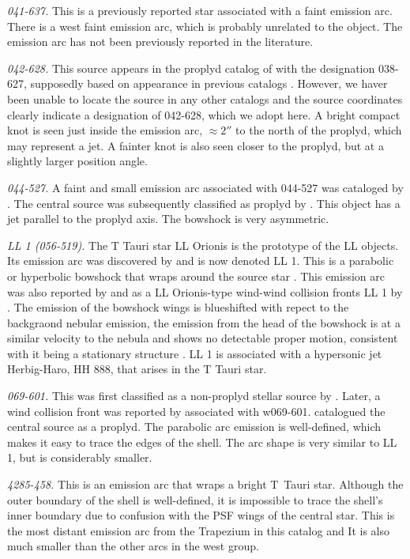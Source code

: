 \documentclass[apj, twocolumn]{aastex63}
\begin{document}
\textit{041-637.} This is a previously reported star \citep{Da-Rio:2009a}
associated with a faint emission arc. There is a west faint emission arc,
which is probably unrelated to the object. The emission arc has not been
previously reported in the literature.

\textit{042-628.} This source appears in the proplyd catalog of
\citet{Ricci:2008a} with the designation 038-627, supposedly based on
appearance in previous catalogs \citep{ODell:1996a}. However, we haver
been unable to locate the source in any other catalogs and the source
coordinates clearly indicate a designation of 042-628, which we adopt
here.  A bright compact knot is seen just inside the emission arc,
\(\approx 2''\) to the north of the proplyd, which may represent a
jet.  A fainter knot is also seen closer to the proplyd, but at a
slightly larger position angle.

\textit{044-527.} A faint and small emission arc associated with 044-527
was cataloged by \citet{Bally:2000a}. The central source was subsequently
classified as proplyd by \citet{Ricci:2008a}. This object has a jet
parallel to the proplyd axis. The bowshock is very asymmetric.

\textit{LL 1 (056-519).} The T Tauri star LL Orionis is the prototype
of the LL objects. Its emission arc was discovered by
\citet{Gull:1979a} and is now denoted LL 1. This is a parabolic or
hyperbolic bowshock that wraps around the source star
\citep{Bally:2006a}. This emission arc was also reported by
\citet{Bally:2000a} and as a LL Orionis-type wind-wind collision
fronts LL 1 by \citet{Bally:2001a}. The emission of the bowshock wings
is blueshifted with repect to the backgraond nebular emission, the
emission from the head of the bowshock is at a similar velocity to the
nebula and shows no detectable proper motion, consistent with it being
a stationary structure \citep{Henney:2013a}. LL 1 is associated with a
hypersonic jet Herbig-Haro, HH 888, that arises in the T Tauri star.
    

\textit{069-601.} This was first classified as a non-proplyd stellar
source by \citet{ODell:1996a}. Later, a wind collision front was
reported by \citet{Bally:2000a} associated with w069-601.
\citet{Ricci:2008a} catalogued the central source as a proplyd.
The parabolic arc emission is well-defined, which makes it easy to
trace the edges of the shell. The arc shape is very similar to LL 1,
but is considerably smaller. 


\textit{4285-458.} This is an emission arc that wraps a bright T~Tauri
star. Although the outer boundary of the shell is well-defined, it is
impossible to trace the shell's inner boundary due to confusion with
the PSF wings of the central star. This is the most distant emission
arc from the Trapezium in this catalog and It is also much smaller
than the other arcs in the west group.
\end{document}
